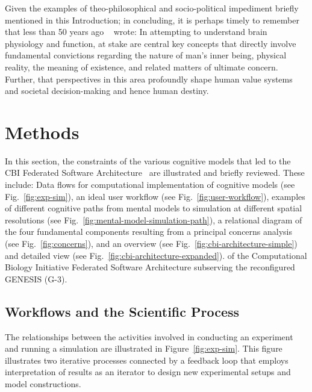 \documentclass[11pt,3p,twocolumn]{JMN}
\begin{document}


Given the examples of theo-philosophical and socio-political impediment briefly mentioned in this Introduction; in concluding, it is perhaps timely to remember that less than 50 years ago  ~\citet{sperry80} wrote: In attempting to understand brain physiology and function, at stake are central key concepts that directly involve fundamental convictions regarding the nature of man's inner being, physical reality, the meaning of existence, and related matters of ultimate concern. Further, that perspectives in this area profoundly shape human value systems and societal decision-making and hence human destiny.

\section{Methods}

In this section, the constraints of the various cognitive models that led to the CBI Federated Software Architecture~\citep[for details, see][]{cornelis12,cornelis08:_cbi_archit_comput_simul_realis} are illustrated and briefly reviewed. These include: Data flows for computational implementation of cognitive models (see Fig.~\ref{fig:exp-sim}), an ideal user workflow (see Fig.~\ref{fig:user-workflow}), examples of different cognitive paths from mental models to simulation at different spatial resolutions (see Fig.~\ref{fig:mental-model-simulation-path}), a relational diagram of the four fundamental components resulting from a principal concerns analysis (see Fig.~\ref{fig:concerns}), and an overview (see Fig.~\ref{fig:cbi-architecture-simple}) and detailed view (see Fig.~\ref{fig:cbi-architecture-expanded}). of the Computational Biology Initiative Federated Software Architecture subserving the reconfigured GENESIS (G-3).

\subsection{Workflows and the Scientific Process}

The relationships between the activities involved in conducting an experiment and running a simulation are illustrated in Figure~\ref{fig:exp-sim}. This figure illustrates two iterative processes connected by a feedback loop that employs interpretation of results as an iterator to design new experimental setups and model constructions.
\end{document}
